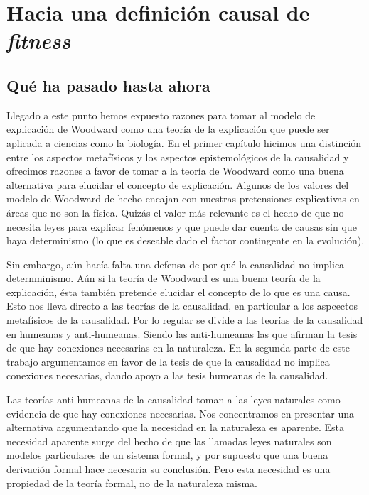 
\chapter{Hacia una definición causal de \emph{fitness}}

\section{Qué ha pasado hasta ahora}

\noindent Llegado a este punto hemos expuesto razones para tomar al modelo de explicación de Woodward como una teoría de la explicación que puede ser aplicada a ciencias como la biología. En el primer capítulo hicimos una distinción entre los aspectos metafísicos y los aspectos epistemológicos de la causalidad y ofrecimos razones a favor de tomar a la teoría de Woodward como una buena alternativa para elucidar el concepto de explicación. Algunos de los valores del modelo de Woodward de hecho encajan con nuestras pretensiones explicativas en áreas que no son la física. Quizás el valor más relevante es el hecho de que no necesita leyes para explicar fenómenos y que puede dar cuenta de causas sin que haya determinismo (lo que es deseable dado el factor contingente en la evolución).

Sin embargo, aún hacía falta una defensa de por qué la causalidad no implica deternminismo. Aún si la teoría de Woodward es una buena teoría de la explicación, ésta también pretende elucidar el concepto de lo que es una causa. Esto nos lleva directo a las teorías de la causalidad, en particular a los aspcectos metafísicos de la causalidad. Por lo regular se divide a las teorías de la causalidad en humeanas y anti-humeanas. Siendo las anti-humeanas las que afirman la tesis de que hay conexiones necesarias en la naturaleza. En la segunda parte de este trabajo argumentamos en favor de la tesis de que la causalidad no implica conexiones necesarias, dando apoyo a las tesis humeanas de la causalidad.

Las teorías anti-humeanas de la causalidad toman a las leyes naturales como evidencia de que hay conexiones necesarias. Nos concentramos en presentar una alternativa argumentando que la necesidad en la naturaleza es aparente. Esta necesidad aparente surge del hecho de que las llamadas leyes naturales son modelos particulares de un sistema formal, y por supuesto que una buena derivación formal hace necesaria su conclusión. Pero esta necesidad es una propiedad de la teoría formal, no de la naturaleza misma.

